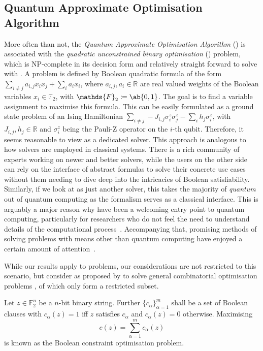 \subsection{Quantum Approximate Optimisation Algorithm}
More often than not, the \emph{Quantum Approximate Optimisation Algorithm} (\QAOA) is associated with the \emph{quadratic unconstrained binary optimisation} (\QUBO) problem, which is NP-complete in its decision form and relatively straight forward to solve with \QAOA. A \QUBO problem is defined by Boolean quadratic formula of the form $\sum_{i \neq j} a_{i,j} x_i x_j + \sum_{i} a_i x_i$, where $a_{i,j},  a_i \in \mathds{R}$ are real valued weights of the Boolean variables $x_i \in \mathds{F}_2$, with $\mathds{F}_2 \coloneqq \ab\{0, 1\}$. The goal is to find a variable assignment to maximise this \QUBO formula. This can be easily formulated as a ground state problem of an Ising Hamiltonian $\sum_{i \neq j} -J_{i,j} \sigma_i^z \sigma_j^z - \sum_i h_j \sigma_i^z$, with $J_{i,j}, h_j \in \mathds{R}$ and $\sigma_i^z$ being the Pauli-Z operator on the $i$-th qubit.
Therefore, it seems reasonable to view \QAOA as a dedicated \QUBO solver. This approach is analogous to how \SAT solvers are employed in classical systems. There is a rich community of \SAT experts working on newer and better solvers, while the users on the other side can rely on the interface of abstract \SAT formulas to solve their concrete use cases without them needing to dive deep into the intricacies of Boolean satisfiability. Similarly, if we look at \QAOA as just another \QUBO solver, this takes the majority of \emph{quantum} out of quantum computing as the \QUBO formalism serves as a classical interface. This is arguably a major reason why \QUBOs have been a welcoming entry point to quantum computing, particularly for researchers 
who do not feel the need to understand details of the computational process~\cite{Kochenberger:2014,lucas2014ising}. Accompanying that, promising methods of solving \QUBO problems with means other than quantum computing have enjoyed a certain amount of attention~\cite{Aramon:2019,Henke:2023,Schoenberger:2023,Alom:2017,Seker:2022}.

While our results apply to \QUBO problems, our considerations 
are not restricted to this scenario, but
consider \QAOA as proposed by \citeauthor{farhi2014quantum} to solve general combinatorial optimisation problems \cite{farhi2014quantum}, of which \QUBOs only form a restricted subset.

\begin{definition}
  \label{def:combinatorial_optimisation}
  Let $z \in \mathds{F}_2^n$ be a $n$-bit binary string. Further $\{c_\alpha\}_{\alpha = 1}^m$ shall be a set of Boolean clauses with $c_\alpha (z) = 1$ iff $z$ satisfies $c_\alpha$ and $c_\alpha (z) = 0$ otherwise. Maximising
  \begin{equation}
    \label{eq:classical_constraint_cost_func}
    c(z) = \sum_{\alpha = 1}^m c_\alpha (z)
  \end{equation}
  is known as the Boolean constraint optimisation problem.
\end{definition}

